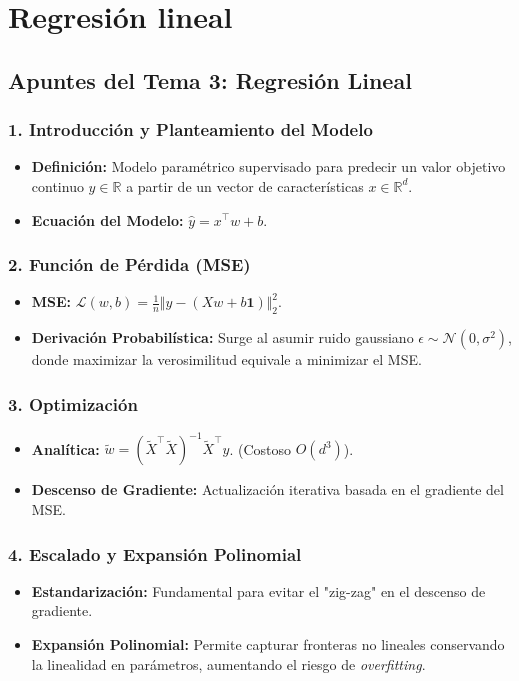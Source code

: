 \chapter{Regresión lineal}

\section{Apuntes del Tema 3: Regresión Lineal}

\subsection{1. Introducción y Planteamiento del Modelo}
\begin{itemize}
	\item \textbf{Definición:} Modelo paramétrico supervisado para predecir un valor objetivo continuo $y \in \mathbb{R}$ a partir de un vector de características $x \in \mathbb{R}^d$.
	\item \textbf{Ecuación del Modelo:} $\hat{y} = x^\top w + b$.
\end{itemize}

\subsection{2. Función de Pérdida (MSE)}
\begin{itemize}
	\item \textbf{MSE:} $\mathcal{L}(w, b) = \frac{1}{n} \Vert y - (Xw + b\mathbf{1}) \Vert_2^2$.
	\item \textbf{Derivación Probabilística:} Surge al asumir ruido gaussiano $\epsilon \sim \mathcal{N}(0, \sigma^2)$, donde maximizar la verosimilitud equivale a minimizar el MSE.
\end{itemize}

\subsection{3. Optimización}
\begin{itemize}
	\item \textbf{Analítica:} $\tilde{w} = (\tilde{X}^\top \tilde{X})^{-1} \tilde{X}^\top y$. (Costoso $O(d^3)$).
	\item \textbf{Descenso de Gradiente:} Actualización iterativa basada en el gradiente del MSE.
\end{itemize}

\subsection{4. Escalado y Expansión Polinomial}
\begin{itemize}
	\item \textbf{Estandarización:} Fundamental para evitar el "zig-zag" en el descenso de gradiente.
	\item \textbf{Expansión Polinomial:} Permite capturar fronteras no lineales conservando la linealidad en parámetros, aumentando el riesgo de \emph{overfitting}.
\end{itemize}

